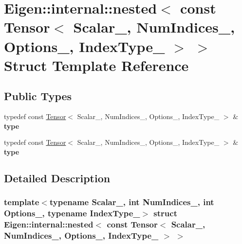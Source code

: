 \hypertarget{struct_eigen_1_1internal_1_1nested_3_01const_01_tensor_3_01_scalar___00_01_num_indices___00_01_o921ff0e47aa2123e7e0ef990f080072a}{}\section{Eigen\+:\+:internal\+:\+:nested$<$ const Tensor$<$ Scalar\+\_\+, Num\+Indices\+\_\+, Options\+\_\+, Index\+Type\+\_\+ $>$ $>$ Struct Template Reference}
\label{struct_eigen_1_1internal_1_1nested_3_01const_01_tensor_3_01_scalar___00_01_num_indices___00_01_o921ff0e47aa2123e7e0ef990f080072a}
\subsection*{Public Types}
\begin{DoxyCompactItemize}
\item 
\mbox{\label{struct_eigen_1_1internal_1_1nested_3_01const_01_tensor_3_01_scalar___00_01_num_indices___00_01_o921ff0e47aa2123e7e0ef990f080072a_ab5db80a2669a7173a47c62c63979fa15}} 
typedef const \hyperlink{class_eigen_1_1_tensor}{Tensor}$<$ Scalar\+\_\+, Num\+Indices\+\_\+, Options\+\_\+, Index\+Type\+\_\+ $>$ \& {\bfseries type}
\item 
\mbox{\label{struct_eigen_1_1internal_1_1nested_3_01const_01_tensor_3_01_scalar___00_01_num_indices___00_01_o921ff0e47aa2123e7e0ef990f080072a_ab5db80a2669a7173a47c62c63979fa15}} 
typedef const \hyperlink{class_eigen_1_1_tensor}{Tensor}$<$ Scalar\+\_\+, Num\+Indices\+\_\+, Options\+\_\+, Index\+Type\+\_\+ $>$ \& {\bfseries type}
\end{DoxyCompactItemize}


\subsection{Detailed Description}
\subsubsection*{template$<$typename Scalar\+\_\+, int Num\+Indices\+\_\+, int Options\+\_\+, typename Index\+Type\+\_\+$>$\newline
struct Eigen\+::internal\+::nested$<$ const Tensor$<$ Scalar\+\_\+, Num\+Indices\+\_\+, Options\+\_\+, Index\+Type\+\_\+ $>$ $>$}




